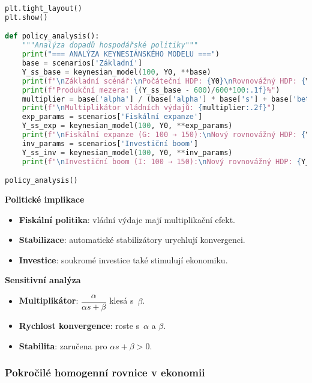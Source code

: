 \begin{example}
\begin{lstlisting}[language=Python, caption={Implementace Keynesiánského modelu v~Pythonu}]
plt.tight_layout()
plt.show()

def policy_analysis():
    """Analýza dopadů hospodářské politiky"""
    print("=== ANALÝZA KEYNESIÁNSKÉHO MODELU ===")
    base = scenarios['Základní']
    Y_ss_base = keynesian_model(100, Y0, **base)
    print(f"\nZákladní scénář:\nPočáteční HDP: {Y0}\nRovnovážný HDP: {Y_ss_base:.1f}")
    print(f"Produkční mezera: {(Y_ss_base - 600)/600*100:.1f}%")
    multiplier = base['alpha'] / (base['alpha'] * base['s'] + base['beta'])
    print(f"\nMultiplikátor vládních výdajů: {multiplier:.2f}")
    exp_params = scenarios['Fiskální expanze']
    Y_ss_exp = keynesian_model(100, Y0, **exp_params)
    print(f"\nFiskální expanze (G: 100 → 150):\nNový rovnovážný HDP: {Y_ss_exp:.1f}\nCelkový dopad: {Y_ss_exp - Y_ss_base:.1f}")
    inv_params = scenarios['Investiční boom']
    Y_ss_inv = keynesian_model(100, Y0, **inv_params)
    print(f"\nInvestiční boom (I: 100 → 150):\nNový rovnovážný HDP: {Y_ss_inv:.1f}\nCelkový dopad: {Y_ss_inv - Y_ss_base:.1f}")

policy_analysis()
\end{lstlisting}

\noindent\textbf{Politické implikace}
\begin{itemize}
\item \textbf{Fiskální politika}: vládní výdaje mají multiplikační efekt.
\item \textbf{Stabilizace}: automatické stabilizátory urychlují konvergenci.
\item \textbf{Investice}: soukromé investice také stimulují ekonomiku.
\end{itemize}

\noindent\textbf{Sensitivní analýza}
\begin{itemize}
\item \textbf{Multiplikátor}: $\dfrac{\alpha}{\alpha s + \beta}$ klesá s~$\beta$.
\item \textbf{Rychlost konvergence}: roste s~$\alpha$ a $\beta$.
\item \textbf{Stabilita}: zaručena pro $\alpha s + \beta > 0$.
\end{itemize}
\end{example}

\subsubsection{Pokročilé homogenní rovnice v ekonomii}
\label{subsec:pokrocile-homogenni}

